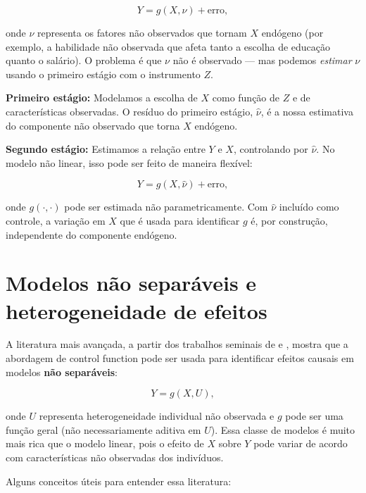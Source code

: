 \begin{equation}
Y = g(X, \nu) + \text{erro},
\end{equation}

\noindent
onde $\nu$ representa os fatores não observados que tornam $X$ endógeno (por exemplo,
a habilidade não observada que afeta tanto a escolha de educação quanto o salário).
O problema é que $\nu$ não é observado — mas podemos \emph{estimar} $\nu$ usando
o primeiro estágio com o instrumento $Z$.

\textbf{Primeiro estágio:} Modelamos a escolha de $X$ como função de $Z$ e de
características observadas. O resíduo do primeiro estágio, $\hat{\nu}$, é a nossa
estimativa do componente não observado que torna $X$ endógeno.

\textbf{Segundo estágio:} Estimamos a relação entre $Y$ e $X$, controlando por
$\hat{\nu}$. No modelo não linear, isso pode ser feito de maneira flexível:

\begin{equation}
Y = g(X, \hat{\nu}) + \text{erro},
\end{equation}

\noindent
onde $g(\cdot, \cdot)$ pode ser estimada não parametricamente. Com $\hat{\nu}$
incluído como controle, a variação em $X$ que é usada para identificar $g$ é, por
construção, independente do componente endógeno.

\section*{Modelos não separáveis e heterogeneidade de efeitos}

A literatura mais avançada, a partir dos trabalhos seminais de
\citet{imbens_identification_2009} e \citet{chesher_identification_2003}, mostra que
a abordagem de control function pode ser usada para identificar efeitos causais em
modelos \textbf{não separáveis}:

\begin{equation}
Y = g(X, U),
\end{equation}

\noindent
onde $U$ representa heterogeneidade individual não observada e $g$ pode ser uma
função geral (não necessariamente aditiva em $U$). Essa classe de modelos é muito
mais rica que o modelo linear, pois o efeito de $X$ sobre $Y$ pode variar de acordo
com características não observadas dos indivíduos.

Alguns conceitos úteis para entender essa literatura:

